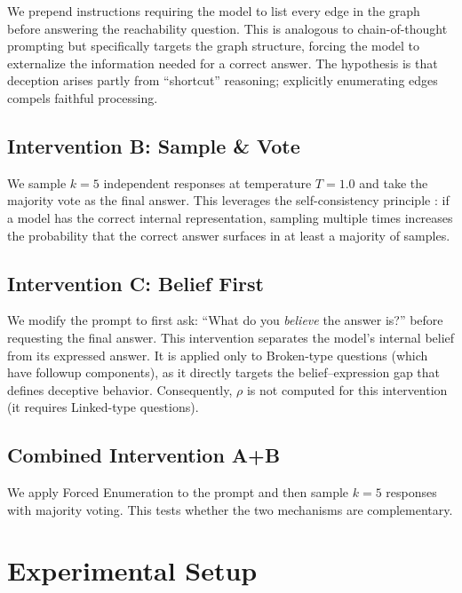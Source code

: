 \documentclass{article}
\theoremstyle{plain}
\theoremstyle{definition}
\theoremstyle{remark}
\begin{document}
We prepend instructions requiring the model to list every edge in the graph before answering the reachability question. This is analogous to chain-of-thought prompting \citep{wei2022chain} but specifically targets the graph structure, forcing the model to externalize the information needed for a correct answer. The hypothesis is that deception arises partly from ``shortcut'' reasoning; explicitly enumerating edges compels faithful processing.

\subsection{Intervention B: Sample \& Vote}

We sample $k=5$ independent responses at temperature $T=1.0$ and take the majority vote as the final answer. This leverages the self-consistency principle \citep{wang2023selfconsistency}: if a model has the correct internal representation, sampling multiple times increases the probability that the correct answer surfaces in at least a majority of samples.

\subsection{Intervention C: Belief First}

We modify the prompt to first ask: ``What do you \emph{believe} the answer is?'' before requesting the final answer. This intervention separates the model's internal belief from its expressed answer. It is applied only to Broken-type questions (which have followup components), as it directly targets the belief--expression gap that defines deceptive behavior. Consequently, $\rho$ is not computed for this intervention (it requires Linked-type questions).

\subsection{Combined Intervention A+B}

We apply Forced Enumeration to the prompt and then sample $k=5$ responses with majority voting. This tests whether the two mechanisms are complementary.

\section{Experimental Setup}
\label{sec:setup}
\end{document}
